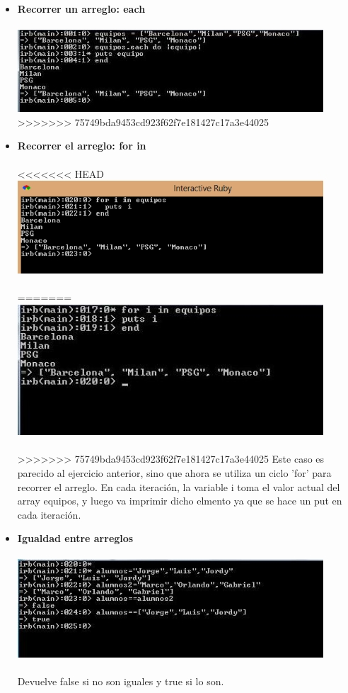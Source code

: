 \documentclass[11pt]{article} %
\begin{document}
\begin{itemize}
     \item  {\bf Recorrer un arreglo: each}\\\\
        \includegraphics[width=0.9\textwidth]{./imagenes/each}\\
>>>>>>> 75749bda9453cd923f62f7e181427c17a3e44025
	

     \item {\bf Recorrer el arreglo: for in}\\\\
<<<<<<< HEAD
	    \includegraphics[width=0.9\textwidth]{./imagenes/RecorridoForin}\\\\
=======
	    \includegraphics[width=0.9\textwidth]{./imagenes/for}\\\\
>>>>>>> 75749bda9453cd923f62f7e181427c17a3e44025
     Este caso es parecido al ejercicio anterior, sino que ahora se utiliza un ciclo 'for' para recorrer el arreglo. En cada iteración, la variable i toma el valor actual del array equipos, y luego va imprimir dicho elmento ya que se hace un put en cada iteración.\\


    \item {\bf Igualdad entre arreglos}\\\\
	    \includegraphics[width=0.9\textwidth]{./imagenes/igualdad}\\\\
Devuelve false si no son iguales y true si lo son.


\end{itemize}
\end{document}
